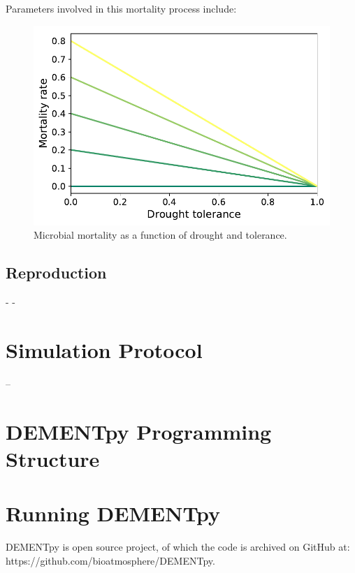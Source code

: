\documentclass[12pt, oneside, titlepage]{article}   	%
\begin{document}
Parameters involved in this mortality process include:

\begin{figure}[H]
  \centering
  \includegraphics[width=\linewidth]{Fig2_Microbial_mortality_prob.pdf}
  \caption{Microbial mortality as a function of drought and tolerance.}
  \label{fig:mortality}
\end{figure}


\subsection{Reproduction}
-
-



\section{Simulation Protocol}
--

\section{DEMENTpy Programming Structure}


\section{Running DEMENTpy}

DEMENTpy is open source project, of which the code is archived on GitHub at: https://github.com/bioatmosphere/DEMENTpy.
\end{document}

